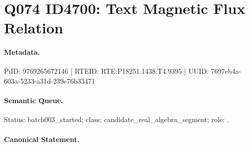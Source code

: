 \section*{Q074 ID4700: Text Magnetic Flux Relation}
\paragraph{Metadata.}
PiID: 9769265672146 | RTEID: RTE:P18251.1438:T4.9395 | UUID: 7697eb4a-603a-5233-a31d-239e76b33471

\paragraph{Semantic Queue.}
Status: batch003\_started; class: candidate\_real\_algebra\_segment; role: .

\paragraph{Canonical Statement.}
